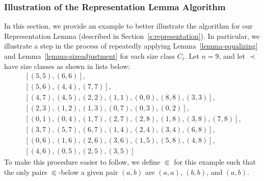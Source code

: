 \documentclass[letterpaper]{article}
\theoremstyle{definition}
\begin{document}
\subsubsection{Illustration of the Representation Lemma Algorithm}
\label{s:supp:illustration}


In this section, we provide an example to better illustrate the algorithm for our Representation Lemma (described in Section~\ref{s:representation}).  In particular, we illustrate a step in the process of repeatedly applying Lemma~\ref{lemma-equalizing} and Lemma~\ref{lemma-sizeadjustment} for each size class $C_i$.  Let $n = 9$, and let $\prec$ have size classes as shown in lists below:
\[
 \begin{array}{l}
\ [(5,5),(6,6)], \\
 \  [(5,6),(4,4),(7,7)], \\
  \  [(4,7),(4,5),(2, 2),(1,1),(0,0),(8,8), (3,3)],\\
  \ [(2,3),  (1,2),(1,3),(0,7),(0,3), (0,2)],\\
\	    [(0,1), (0,4),(1,7),(2,7), (2,8),(1,8), (3,8), (7,8)],\\
 \        [(3,7), (5,7),(6,7),(1,4),(2,4), (3,4), (6,8)], \\
\	    [(0,6),(1,6),(2,6),(3,6),(1,5), (5,8), (4,8)],\\
 \        [(4,6),(0,5),(2,5),(3,5)]
         \end{array}
\]
To make this procedure easier to follow, we define $\Subset$ for this example such that the only pairs $\Subset$-below a given pair $(a, b)$ are $(a, a)$, $(b, b)$, and $(a, b)$.
 
\end{document}
